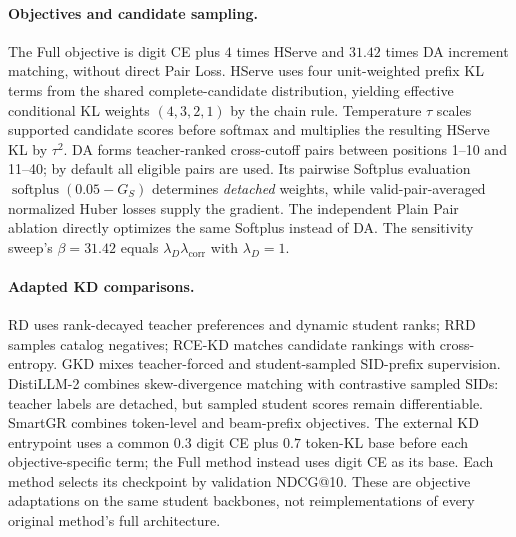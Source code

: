 \paragraph{Objectives and candidate sampling.}
The Full objective is digit CE plus $4$ times HServe and
$31.42$ times DA increment matching, without direct Pair Loss.
HServe uses four unit-weighted prefix KL terms from the shared
complete-candidate distribution, yielding effective conditional
KL weights $(4,3,2,1)$ by the chain rule. Temperature $\tau$
scales supported candidate scores before softmax and multiplies
the resulting HServe KL by $\tau^2$.
DA forms teacher-ranked cross-cutoff pairs between positions
1--10 and 11--40; by default all eligible pairs are used.
Its pairwise Softplus evaluation
$\operatorname{softplus}(0.05-G_S)$ determines \emph{detached}
weights, while valid-pair-averaged normalized Huber losses
supply the gradient. The independent Plain Pair ablation
directly optimizes the same Softplus instead of DA.
The sensitivity sweep's $\beta=31.42$ equals
$\lambda_D\lambda_{\mathrm{corr}}$ with $\lambda_D=1$.

\paragraph{Adapted KD comparisons.}
RD uses rank-decayed teacher preferences and dynamic student
ranks; RRD samples catalog negatives; RCE-KD matches candidate
rankings with cross-entropy. GKD mixes teacher-forced and
student-sampled SID-prefix supervision. DistiLLM-2 combines
skew-divergence matching with contrastive sampled SIDs:
teacher labels are detached, but sampled student scores
remain differentiable. SmartGR combines token-level and
beam-prefix objectives. The external KD entrypoint uses
a common $0.3$ digit CE plus $0.7$ token-KL base before each
objective-specific term; the Full method instead uses digit CE
as its base. Each method selects its checkpoint by
validation NDCG@10. These are objective adaptations on the
same student backbones, not reimplementations of every
original method's full architecture.
